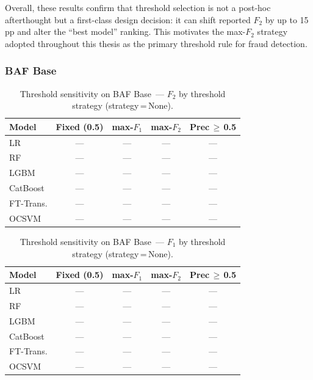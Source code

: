 Overall, these results confirm that threshold selection is not a post-hoc afterthought
but a first-class design decision: it can shift reported $F_2$ by up to 15\,pp
and alter the ``best model'' ranking.
This motivates the max-$F_2$ strategy adopted throughout this thesis
as the primary threshold rule for fraud detection.


\subsubsection{BAF Base}

\begin{table}[ht]
\centering
\caption{Threshold sensitivity on BAF Base~--- $F_2$ by threshold strategy (strategy\,=\,None).}
\label{tab:threshold_baf_f2}
\begin{tabular}{l c c c c}
\toprule
Model & Fixed (0.5) & max-$F_1$ & max-$F_2$ & Prec\,$\geq$\,0.5 \\
\midrule
LR        & --- & --- & --- & --- \\
RF        & --- & --- & --- & --- \\
LGBM      & --- & --- & --- & --- \\
CatBoost  & --- & --- & --- & --- \\
FT-Trans. & --- & --- & --- & --- \\
OCSVM     & --- & --- & --- & --- \\
\bottomrule
\end{tabular}
\end{table}

\begin{table}[ht]
\centering
\caption{Threshold sensitivity on BAF Base~--- $F_1$ by threshold strategy (strategy\,=\,None).}
\label{tab:threshold_baf_f1}
\begin{tabular}{l c c c c}
\toprule
Model & Fixed (0.5) & max-$F_1$ & max-$F_2$ & Prec\,$\geq$\,0.5 \\
\midrule
LR        & --- & --- & --- & --- \\
RF        & --- & --- & --- & --- \\
LGBM      & --- & --- & --- & --- \\
CatBoost  & --- & --- & --- & --- \\
FT-Trans. & --- & --- & --- & --- \\
OCSVM     & --- & --- & --- & --- \\
\bottomrule
\end{tabular}
\end{table}

